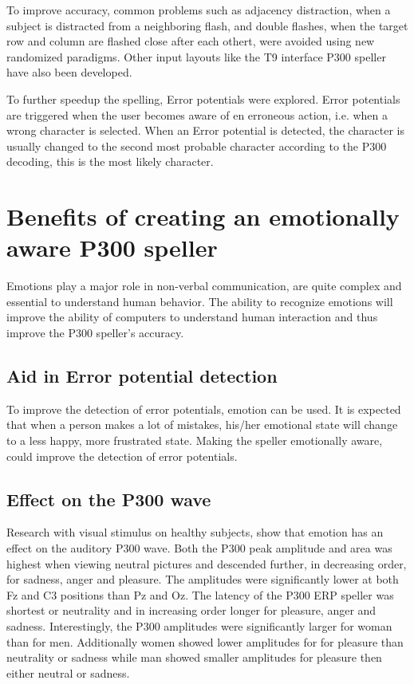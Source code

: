 To improve accuracy, common problems such as adjacency distraction, when a subject is distracted from a neighboring flash, and double flashes, when the target row and column are flashed close after each othert, were avoided using new randomized paradigms\cite{PaperThibault}. Other input layouts like the T9 interface P300 speller have also been developed\cite{P300T9}. 

\npar

To further speedup the spelling, Error potentials were explored\cite{ErrorPotentials}. Error potentials are triggered when the user becomes aware of en erroneous action, i.e. when a wrong character is selected. When an Error potential is detected, the character is usually changed to the second most probable character according to the P300 decoding\cite{ErrSecChar}, this is the most likely character.

\section{Benefits of creating an emotionally aware P300 speller}

Emotions play a major role in non-verbal communication, are quite complex and essential to understand human behavior. The ability to recognize emotions will improve the ability of computers to understand human interaction\cite{CompRecognizeEmotion} and thus improve the P300 speller's accuracy.

\subsection{Aid in Error potential detection}

To improve the detection of error potentials, emotion can be used. It is expected that when a person makes a lot of mistakes, his/her emotional state will change to a less happy, more frustrated state. Making the speller emotionally aware, could improve the detection of error potentials.

\subsection{Effect on the P300 wave}

Research with visual stimulus on healthy subjects, show that emotion has an effect on the auditory P300 wave\cite{AuditoryP300Effect}. Both the P300 peak amplitude and area was highest when viewing neutral pictures and descended further, in decreasing order, for sadness, anger and pleasure. The amplitudes were significantly lower at both Fz and C3 positions than Pz and Oz. The latency of the P300 ERP speller was shortest or neutrality and in increasing order longer for pleasure, anger and sadness. Interestingly, the P300 amplitudes were significantly larger for woman than for men. Additionally women showed lower amplitudes for for pleasure than neutrality or sadness while man showed smaller amplitudes for pleasure then either neutral or sadness. 

